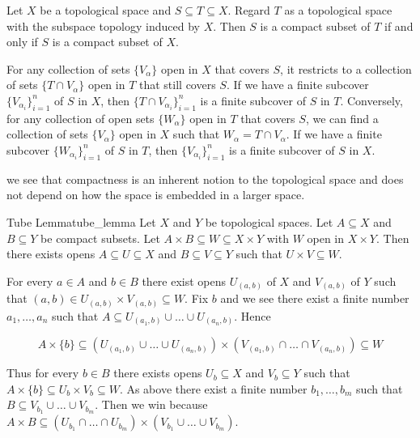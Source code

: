 \documentclass{report}
\begin{document}
\begin{lemma}{}{}
	Let $X$ be a topological space and $S \subseteq T \subseteq X$. Regard $T$ as a topological space with the subspace topology induced by $X$. Then $S$ is a compact subset of $T$ if and only if $S$ is a compact subset of $X$.
\end{lemma}

\begin{prf}
	For any collection of sets $\{V_\alpha\}$ open in $X$ that covers $S$, it restricts to a collection of sets $\{T\cap V_\alpha\}$ open in $T$ that still covers $S$. If we have a finite subcover $\{V_{\alpha_i}\}_{i=1}^n$ of $S$ in $X$, then $\{T\cap V_{\alpha_i}\}_{i=1}^n$ is a finite subcover of $S$ in $T$. Conversely, for any collection of open sets $\{W_\alpha\}$ open in $T$ that covers $S$, we can find a collection of sets $\{V_\alpha\}$ open in $X$ such that $W_\alpha=T\cap V_\alpha$. If we have a finite subcover $\{W_{\alpha_i}\}_{i=1}^n$ of $S$ in $T$, then $\{V_{\alpha_i}\}_{i=1}^n$ is a finite subcover of $S$ in $X$.
\end{prf}

we see that compactness is an inherent notion to the topological space and does not depend on how the space is embedded in a larger space.

\begin{lemma}{Tube Lemma}{tube_lemma}
	 Let $X$ and $Y$ be topological spaces. Let $A \subseteq X$ and $B \subseteq Y$ be compact subsets. Let $A \times B \subseteq W \subseteq X \times Y$ with $W$ open in $X \times Y$. Then there exists opens $A \subseteq U \subseteq X$ and $B \subseteq V \subseteq Y$ such that $U \times V \subseteq W$.
\end{lemma}
\begin{prf}
	For every $a \in A$ and $b \in B$ there exist opens $U_{(a, b)}$ of $X$ and $V_{(a, b)}$ of $Y$ such that $(a, b) \in U_{(a, b)} \times V_{(a, b)} \subseteq W$. Fix $b$ and we see there exist a finite number $a_1, \ldots, a_n$ such that $A \subseteq U_{\left(a_1, b\right)} \cup \ldots \cup U_{\left(a_n, b\right)}$. Hence

$$
A \times\{b\} \subseteq \left(U_{\left(a_1, b\right)} \cup \ldots \cup U_{\left(a_n, b\right)}\right) \times\left(V_{\left(a_1, b\right)} \cap \ldots \cap V_{\left(a_n, b\right)}\right) \subseteq W
$$


Thus for every $b \in B$ there exists opens $U_b \subseteq X$ and $V_b \subseteq Y$ such that $A \times\{b\} \subseteq U_b \times V_b \subseteq W$. As above there exist a finite number $b_1, \ldots, b_m$ such that $B \subseteq V_{b_1} \cup \ldots \cup V_{b_m}$. Then we win because $A \times B \subseteq \left(U_{b_1} \cap \ldots \cap U_{b_m}\right) \times\left(V_{b_1} \cup \ldots \cup V_{b_m}\right)$.
\end{prf}
\end{document}
